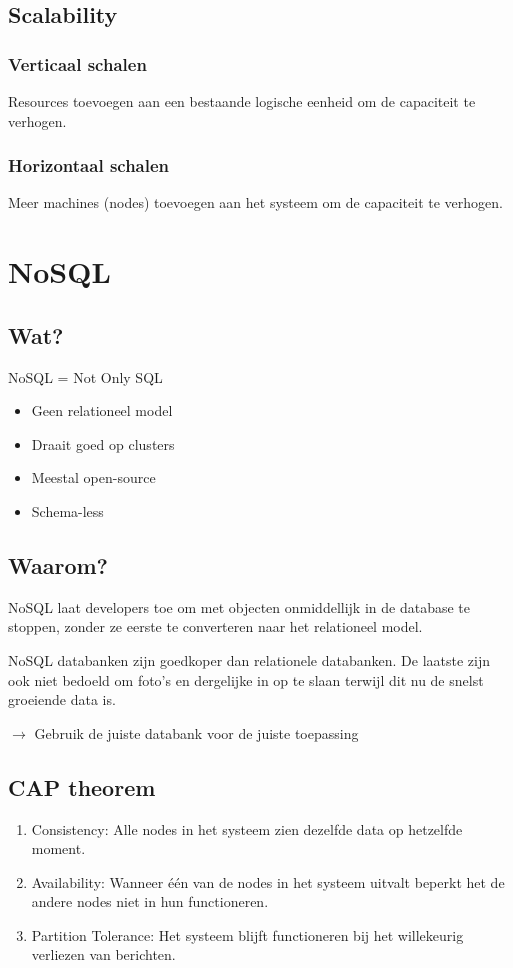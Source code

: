 \documentclass[a4paper,12pt]{article}
\begin{document}
\subsection{Scalability}
\subsubsection{Verticaal schalen}
Resources toevoegen aan een bestaande logische eenheid om de capaciteit te verhogen.
\subsubsection{Horizontaal schalen}
Meer machines (nodes) toevoegen aan het systeem om de capaciteit te verhogen.

\section{NoSQL}
\subsection{Wat?}
NoSQL = Not Only SQL

\begin{itemize}
\item Geen relationeel model
\item Draait goed op clusters
\item Meestal open-source
\item Schema-less
\end{itemize}

\subsection{Waarom?}
NoSQL laat developers toe om met objecten onmiddellijk in de database te stoppen, zonder ze eerste te converteren naar het relationeel model.

NoSQL databanken zijn goedkoper dan relationele databanken.
De laatste zijn ook niet bedoeld om foto's en dergelijke in op te slaan terwijl dit nu de snelst groeiende data is.

$\rightarrow$ Gebruik de juiste databank voor de juiste toepassing

\subsection{CAP theorem}
\begin{enumerate}
\item Consistency: Alle nodes in het systeem zien dezelfde data op hetzelfde moment.
\item Availability: Wanneer één van de nodes in het systeem uitvalt beperkt het de andere nodes niet in hun functioneren.
\item Partition Tolerance: Het systeem blijft functioneren bij het willekeurig verliezen van berichten.
\end{enumerate}
\end{document}
